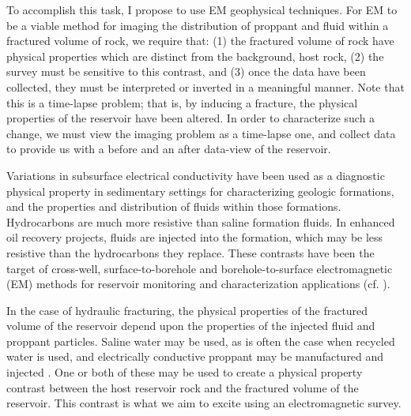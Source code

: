 

To accomplish this task, I propose to use EM geophysical techniques. For EM to be a viable method for imaging the distribution of proppant and fluid within a fractured volume of rock, we require that: (1) the fractured volume of rock have physical properties which are distinct from the background, host rock, (2) the survey must be sensitive to this contrast, and (3) once the data have been collected, they must be interpreted or inverted in a meaningful manner. Note that this is a time-lapse problem; that is, by inducing a fracture, the physical properties of the reservoir have been altered. In order to characterize such a change, we must view the imaging problem as a time-lapse one, and collect data to provide us with a before and an after data-view of the reservoir.

Variations in subsurface electrical conductivity have been used as a diagnostic physical property in sedimentary settings for characterizing geologic formations, and the properties and distribution of fluids within those formations. Hydrocarbons are much more resistive than saline formation fluids. In enhanced oil recovery projects, fluids are injected into the formation, which may be less resistive than the hydrocarbons they replace. These contrasts have been the target of cross-well, surface-to-borehole and borehole-to-surface electromagnetic (EM) methods for reservoir monitoring and characterization applications (cf. \cite{Bevc1991, Wilt1995, marsala2008, marsala2011, Marsala2014}).

In the case of hydraulic fracturing, the physical properties of the fractured volume of the reservoir depend upon the properties of the injected fluid and proppant particles. Saline water may be used, as is often the case when recycled water is used, and electrically conductive proppant may be manufactured and injected \citep{cannan2014electrically, Vengosh2014, King2010}. One or both of these may be used to create a physical property contrast between the host reservoir rock and the fractured volume of the reservoir. This contrast is what we aim to excite using an electromagnetic survey.


